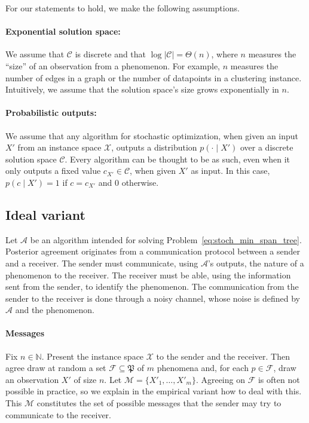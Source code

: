 For our statements to hold, we make the following assumptions.

\paragraph{Exponential solution space:} We assume that $\mathcal{C}$ is discrete and that $\log \left|\mathcal{C}\right| = \Theta(n)$, where $n$ measures the ``size'' of an observation from a phenomenon. For example, $n$ measures the number of edges in a graph or the number of datapoints in a clustering instance. Intuitively, we assume that the solution space's size grows exponentially in $n$.

\paragraph{Probabilistic outputs:} We assume that any algorithm for stochastic optimization, when given an input $X'$ from an instance space $\mathcal{X}$, outputs a distribution $p(\cdot \mid X')$ over a discrete solution space $\mathcal{C}$. Every algorithm can be thought to be as such, even when it only outputs a fixed value $c_{X'} \in \mathcal{C}$, when given $X'$ as input. In this case, $p(c \mid X') = 1$ if $c = c_{X'}$ and $0$ otherwise.

\subsection{Ideal variant}

Let $\mathcal{A}$ be an algorithm intended for solving Problem~\ref{eq:stoch_min_span_tree}. Posterior agreement originates from a communication protocol between a sender and a receiver. The sender must communicate, using $\mathcal{A}$'s outputs, the nature of a phenomenon to the receiver. The receiver must be able, using the information sent from the sender, to identify the phenomenon. The communication from the sender to the receiver is done through a noisy channel, whose noise is defined by $\mathcal{A}$ and the phenomenon.

\paragraph{Messages} Fix $n \in \mathbb{N}$. Present the instance space $\mathcal{X}$ to the sender and the receiver. Then agree draw at random a set $\mathcal{F} \subseteq \mathfrak{P}$ of $m$ phenomena and, for each $p \in \mathcal{F}$, draw an observation $X'$ of size $n$. Let $\mathcal{M} = \{X'_1, \ldots, X'_m\}$. Agreeing on $\mathcal{F}$ is often not possible in practice, so we explain in the empirical variant how to deal with this. This $\mathcal{M}$ constitutes the set of possible messages that the sender may try to communicate to the receiver.

